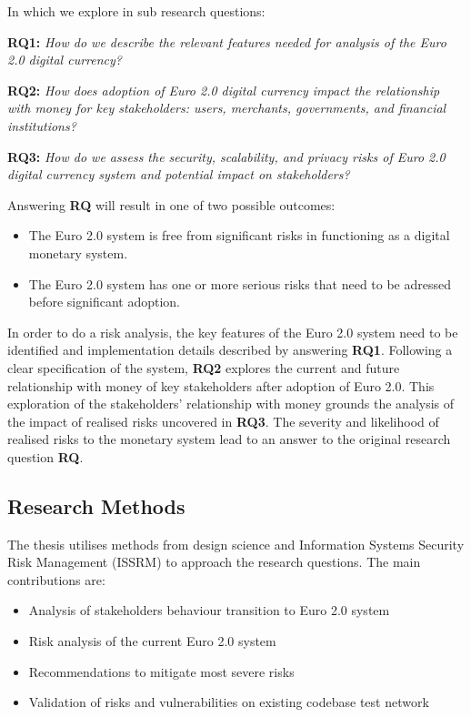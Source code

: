 \documentclass[12pt]{article} %
\begin{document}
In which we explore in sub research questions:
\begin{quoting}
\textbf{RQ1: }\textit{How do we describe the relevant features needed for analysis of the Euro 2.0 digital currency?}
\end{quoting}
\begin{quoting}
\textbf{RQ2: }\textit{How does adoption of Euro 2.0 digital currency impact the relationship with money for key stakeholders: users, merchants, governments, and financial institutions?}
\end{quoting}
\begin{quoting}
\textbf{RQ3: }\textit{How do we assess the security, scalability, and privacy risks of Euro 2.0 digital currency system and potential impact on stakeholders?}
\end{quoting}

Answering \textbf{RQ} will result in one of two possible outcomes:
\begin{itemize}
	\item The Euro 2.0 system is free from significant risks in functioning as a digital monetary system.
	\item The Euro 2.0 system has one or more serious risks that need to be adressed before significant adoption.
\end{itemize}
In order to do a risk analysis, the key features of the Euro 2.0 system need to be identified and implementation details described by answering \textbf{RQ1}. Following a clear specification of the system, \textbf{RQ2} explores the current and future relationship with money of key stakeholders after adoption of Euro 2.0. This exploration of the stakeholders' relationship with money grounds the analysis of the impact of realised risks uncovered in \textbf{RQ3}. The severity and likelihood of realised risks to the monetary system lead to an answer to the original research question \textbf{RQ}.

\subsection{Research Methods} \label{ssec:1.3}
The thesis utilises methods from design science and Information Systems Security Risk Management (ISSRM) to approach the research questions. The main contributions are:
\begin{itemize}
	\item Analysis of stakeholders behaviour transition to Euro 2.0 system
	\item Risk analysis of the current Euro 2.0 system
	\item Recommendations to mitigate most severe risks
	\item Validation of risks and vulnerabilities on existing codebase test network
\end{itemize}
\end{document}

